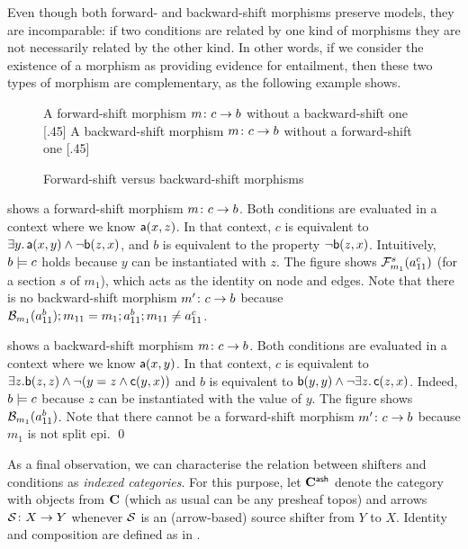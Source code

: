 \medskip\noindent
Even though both forward- and backward-shift morphisms preserve models, they are incomparable: if two conditions are related by one kind of morphisms they are not necessarily related by the other kind. In other words, if we consider the existence of a morphism as providing evidence for entailment, then these two types of morphism are complementary, as the following example shows.
%
\begin{figure}[t]
\centering
\subcaptionbox
  {A forward-shift morphism $m \colon c \rightarrow b$ without a backward-shift one
  }
  [.45\textwidth]
  {}
  \qquad
\subcaptionbox
  {A backward-shift morphism $m \colon c \rightarrow b$ without a forward-shift one
  }
  [.45\textwidth]
  {}
\caption{Forward-shift versus backward-shift morphisms}
\end{figure}
%
\begin{example}
 shows a forward-shift morphism $m \colon c \rightarrow b$. 
Both conditions are evaluated in a context where we know $\mathsf{a}(x,z)$. In that context,  $c$ is equivalent to $\exists y.\, \mathsf{a}(x,y) \wedge \neg \mathsf{b}(z,x)$, and $b$ is equivalent to the property $\neg \mathsf{b}(z,x)$. Intuitively, $b\models c$ holds because $y$ can be instantiated with $z$. The figure shows $\mathcal{F}_{m_1}^s(a^c_{11})$ (for a section $s$ of $m_1$), which acts as the identity on node and edges. Note that there is no backward-shift morphism $m'\colon c \rightarrow b$ because $\mathcal{B}_{m_1}(a^b_{11}) ; m_{11} = m_1; a^b_{11} ; m_{11} \not = a^c_{11}$.

 shows a backward-shift morphism $m \colon c \rightarrow b$. 
Both conditions are evaluated in a context where we know $\mathsf{a}(x,y)$. In that context, $c$ is equivalent to $\exists z.\mathsf{b}(z,z) \wedge \neg(y=z \wedge \mathsf{c}(y,x))$ and $b$ is equivalent to $\mathsf{b}(y,y) \wedge \neg \exists z.\, \mathsf{c}(z,x)$.
Indeed, $b\models c$ because $z$ can be instantiated with the value of $y$. The figure shows $\mathcal{B}_{m_1}(a^b_{11})$. Note that there cannot be a forward-shift morphism $m'\colon c \rightarrow b$ because $m_1$ is not split epi.
\qed
\end{example}
%
As a final observation, we can characterise the relation between shifters and conditions as \emph{indexed categories}. For this purpose, let $\mathbf{C}^{\mathsf{ash}}$ denote the category with objects from $\mathbf{C}$ (which as usual can be any presheaf topos) and arrows $\mathcal{S}\colon X\rightarrow Y$ whenever $\mathcal{S}$ is an (arrow-based) source shifter from $Y$ to $X$. Identity and composition are defined as in .

